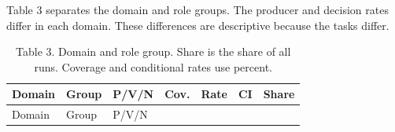 \documentclass[
  10pt,
  a4paper,
]{article}
\begin{document}
Table 3 separates the domain and role groups. The producer and decision
rates differ in each domain. These differences are descriptive because
the tasks differ.

\begin{longtable}[]{@{}
  >{\raggedright\arraybackslash}p{}
  >{\raggedright\arraybackslash}p{}
  >{\raggedleft\arraybackslash}p{}
  >{\raggedleft\arraybackslash}p{}
  >{\raggedleft\arraybackslash}p{}
  >{\raggedleft\arraybackslash}p{}
  >{\raggedleft\arraybackslash}p{}@{}}
\caption{Table 3. Domain and role group. Share is the share of all runs.
Coverage and conditional rates use percent.}\tabularnewline
\toprule\noalign{}
\begin{minipage}[b]{\linewidth}\raggedright
Domain
\end{minipage} & \begin{minipage}[b]{\linewidth}\raggedright
Group
\end{minipage} & \begin{minipage}[b]{\linewidth}\raggedleft
P/V/N
\end{minipage} & \begin{minipage}[b]{\linewidth}\raggedleft
Cov.
\end{minipage} & \begin{minipage}[b]{\linewidth}\raggedleft
Rate
\end{minipage} & \begin{minipage}[b]{\linewidth}\raggedleft
CI
\end{minipage} & \begin{minipage}[b]{\linewidth}\raggedleft
Share
\end{minipage} \\
\midrule\noalign{}
\endfirsthead
\toprule\noalign{}
\begin{minipage}[b]{\linewidth}\raggedright
Domain
\end{minipage} & \begin{minipage}[b]{\linewidth}\raggedright
Group
\end{minipage} & \begin{minipage}[b]{\linewidth}\raggedleft
P/V/N
\end{minipage} & \begin{minipage}[b]{\linewidth}\raggedleft

\end{minipage}
\end{longtable}
\end{document}
